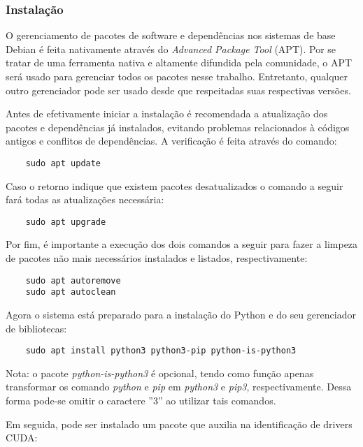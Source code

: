 \documentclass[12pt,a4paper]{article}
\begin{document}
\subsubsection{Instalação}

O gerenciamento de pacotes de software e dependências nos sistemas de base Debian é feita nativamente através do \emph{Advanced Package Tool} (APT). Por se tratar de uma ferramenta nativa e altamente difundida pela comunidade, o APT será usado para gerenciar todos os pacotes nesse trabalho. Entretanto, qualquer outro gerenciador pode ser usado desde que respeitadas suas respectivas versões.

Antes de efetivamente iniciar a instalação é recomendada a atualização dos pacotes e dependências já instalados, evitando problemas relacionados à códigos antigos e conflitos de dependências. A verificação é feita através do comando:

\begin{verbatim}
    sudo apt update
\end{verbatim}

Caso o retorno indique que existem pacotes desatualizados o comando a seguir fará todas as atualizações necessária:

\begin{verbatim}
    sudo apt upgrade
\end{verbatim}

Por fim, é importante a execução dos dois comandos a seguir para fazer a limpeza de pacotes não mais necessários instalados e listados, respectivamente:

\begin{verbatim}
    sudo apt autoremove
    sudo apt autoclean
\end{verbatim}

Agora o sistema está preparado para a instalação do Python e do seu gerenciador de bibliotecas:

\begin{verbatim}
    sudo apt install python3 python3-pip python-is-python3
\end{verbatim}

Nota: o pacote \emph{python-is-python3} é opcional, tendo como função apenas transformar os comando \emph{python} e \emph{pip} em \emph{python3} e \emph{pip3}, respectivamente. Dessa forma pode-se omitir o caractere ''3'' ao utilizar tais comandos.

Em seguida, pode ser instalado um pacote que auxilia na identificação de drivers CUDA:
\end{document}
